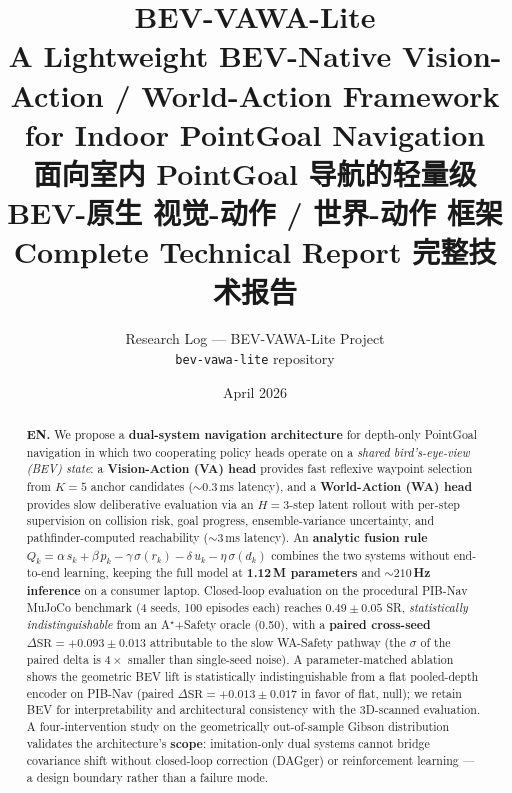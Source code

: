 \documentclass[11pt,a4paper]{article}
\title{\textbf{BEV-VAWA-Lite}\\[2pt]
       \normalsize A Lightweight BEV-Native Vision-Action / World-Action Framework\\
       for Indoor PointGoal Navigation\\[4pt]
       \normalsize\color{zhcol}\textsf{面向室内 PointGoal 导航的轻量级 BEV-原生 视觉-动作 / 世界-动作 框架}\\[10pt]
       \large Complete Technical Report \quad\color{zhcol}\textsf{完整技术报告}}
\author{Research Log — BEV-VAWA-Lite Project\\
        \small \texttt{bev-vawa-lite} repository}
\date{April 2026}
\begin{document}
\maketitle

\begin{abstract}\noindent
\textbf{EN.} We propose a \textbf{dual-system navigation architecture}
for depth-only PointGoal navigation in which two cooperating policy
heads operate on a \emph{shared bird's-eye-view (BEV) state}: a
\textbf{Vision-Action (VA) head} provides fast reflexive waypoint
selection from $K{=}5$ anchor candidates ($\sim\!0.3$\,ms latency), and
a \textbf{World-Action (WA) head} provides slow deliberative
evaluation via an $H{=}3$-step latent rollout with per-step
supervision on collision risk, goal progress, ensemble-variance
uncertainty, and pathfinder-computed reachability ($\sim\!3$\,ms
latency). An \textbf{analytic fusion rule}
$Q_k = \alpha\,s_k + \beta\,p_k - \gamma\,\sigma(r_k) - \delta\,u_k -
\eta\,\sigma(d_k)$ combines the two systems without end-to-end
learning, keeping the full model at \textbf{1.12\,M parameters} and
\textbf{$\sim\!210$\,Hz inference} on a consumer laptop. Closed-loop
evaluation on the procedural PIB-Nav MuJoCo benchmark (4 seeds, 100
episodes each) reaches $0.49 \pm 0.05$ SR, \emph{statistically
indistinguishable} from an A$^\star$+Safety oracle (0.50), with a
\textbf{paired cross-seed $\Delta \mathrm{SR} = +0.093 \pm 0.013$}
attributable to the slow WA-Safety pathway (the $\sigma$ of the paired
delta is $4\times$ smaller than single-seed noise). A parameter-matched
ablation shows the geometric BEV lift is statistically indistinguishable
from a flat pooled-depth encoder on PIB-Nav (paired
$\Delta \mathrm{SR} = +0.013 \pm 0.017$ in favor of flat, null);
we retain BEV for interpretability and architectural consistency with
the 3D-scanned evaluation. A four-intervention study on the
geometrically out-of-sample Gibson distribution validates the
architecture's \textbf{scope}: imitation-only dual systems cannot
bridge covariance shift without closed-loop correction (DAGger) or
reinforcement learning — a design boundary rather than a failure mode.


\end{abstract}
\end{document}
